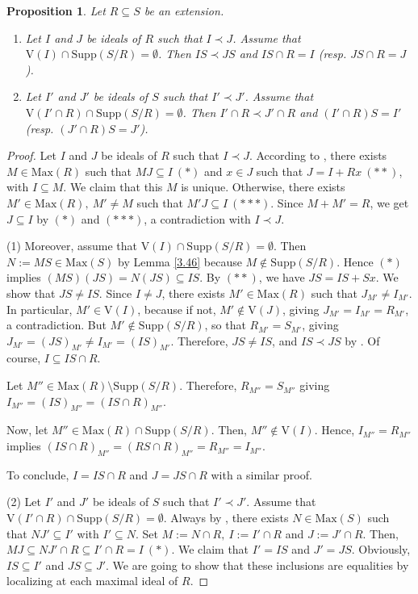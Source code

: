 \documentclass[12pt,leqno]{amsart}
\newtheorem{proposition}[theorem]{Proposition}
\theoremstyle{definition}
\begin{document}
\begin{proposition}\label{3.35}Let $R\subseteq S$ be an extension.\begin{enumerate} 
\item Let $I$ and $J$ be ideals of $R$ such that $I\prec J$. Assume that $\mathrm{V}(I)\cap\mathrm{Supp}(S/R)=\emptyset$. Then $IS\prec JS$ and $IS\cap R=I$ (resp. $JS\cap R=J$).
\item Let $I'$ and $J'$ be ideals of $S$ such that $I'\prec J'$. Assume that $\mathrm{V}(I'\cap R)\cap\mathrm{Supp}(S/R)=\emptyset$. Then $I'\cap R\prec J'\cap R$ and $(I'\cap R)S=I'$ (resp. $(J'\cap R)S=J'$).
\end{enumerate}
\end{proposition}
\begin{proof} Let $I$ and $J$ be ideals of $R$ such that $I\prec J$. According to \cite[Corollary 1, p. 237]{ZS}, there exists $M\in\mathrm{Max}(R)$ such that $MJ\subseteq I\ (*)$ and $x\in J$ such that $J=I+Rx\ (**)$, with $I\subseteq M$. We claim that this $M$ is unique. Otherwise, there exists $M'\in\mathrm{Max}(R),\ M'\neq M$ such that $M'J\subseteq I\ (***)$. Since $M+M'=R$, we get $J\subseteq I$ by $(*)$ and $(***)$, a contradiction with $I\prec J$.   

(1) Moreover, assume that $\mathrm{V}(I)\cap\mathrm{Supp}(S/R)=\emptyset$. Then $N:=MS\in\mathrm{Max}(S)$ by Lemma \ref{3.46} because $M\not\in\mathrm{Supp}(S/R)$. Hence $(*)$ implies $(MS)(JS)=N (JS)\subseteq IS$. By $(**)$, we have $JS=IS+Sx$. We show that $JS\neq IS$. Since $I\neq J$, there exists $M'\in\mathrm{Max}(R)$ such that $J_ {M'}\neq I_{M'}$. In particular, $M'\in\mathrm{V}(I)$, because if not, $M'\not \in\mathrm{V}(J)$, giving $J_{M'}=I_{M'}=R_{M'}$, a contradiction. But $M' \not\in\mathrm{Supp}(S/R)$, so that $R_{M'}=S_{M'}$, giving $J_{M'}= (JS) _{M'}\neq I_{M'}=(IS)_{M'}$. Therefore, $JS\neq IS$, and $IS\prec JS$ by \cite[Corollary 1, p. 237]{ZS}. Of course, $I\subseteq IS\cap R$.
 
Let $M''\in\mathrm{Max}(R)\setminus\mathrm{Supp}(S/R)$. Therefore, $R_ {M''}=S_{M''}$ giving $I_{M''}=(IS)_{M''}=(IS\cap R)_{M''}$.

Now, let $M''\in\mathrm{Max}(R)\cap\mathrm{Supp}(S/R)$. Then, $M''\not\in\mathrm{V}(I)$. Hence, $I_{M''}=R_{M''}$ implies $(IS\cap R)_{M''}=(RS\cap R)_{M''}=R_{M''}=I_{M''}$. 
 
 To conclude, $I=IS\cap R$ and $J=JS\cap R$ with a similar proof.
 
(2) Let $I'$ and $J'$ be ideals of $S$ such that $I'\prec J'$. Assume that $\mathrm{V}(I'\cap R)\cap\mathrm{Supp}(S/R)=\emptyset$. Always by  \cite[Corollary 1, p. 237]{ZS}, there exists $N\in\mathrm{Max}(S)$ such that $NJ'\subseteq I'$ with $I'\subseteq N$. Set $M:=N\cap R,\ I:=I'\cap R$ and $J:=J'\cap R$. Then, $MJ\subseteq NJ'\cap R\subseteq I'\cap R=I\ (*)$. We claim that $I'= IS$ and $J'=JS$. Obviously, $IS\subseteq I'$ and $JS\subseteq J'$. We are going to show that these inclusions are equalities by localizing at each maximal ideal of $R$. 
 

\end{proof}
\end{document}
